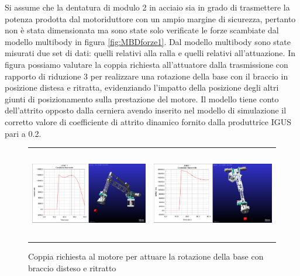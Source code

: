 \documentclass[%
corpo=11pt,
twoside,
 stile=classica,
oldstyle,
greek,%
]{toptesi}
\begin{document}
		Si assume che la dentatura di modulo 2 in acciaio sia in grado di trasmettere la potenza prodotta dal motoriduttore con un ampio margine di sicurezza, pertanto non è stata dimensionata ma sono state solo verificate le forze scambiate dal modello multibody in figura \ref{fig:MBDforze1}. 
		Dal modello multibody sono state misurati due set di dati: quelli relativi alla ralla e quelli relativi all'attuazione. 
		In figura possiamo valutare la coppia richiesta all'attuatore dalla trasmissione con rapporto di riduzione 3 per realizzare una rotazione della base con il braccio in posizione distesa e ritratta, evidenziando l'impatto della posizione degli altri giunti di posizionamento sulla prestazione del motore. 
		Il modello tiene conto dell'attrito opposto dalla cerniera avendo inserito nel modello di simulazione il corretto valore di coefficiente di attrito dinamico fornito dalla produttrice IGUS pari a 0.2. 

		\begin{figure} [!ht]
			\centering
			\begin{tabular}{ll}
				\includegraphics[height=4cm,keepaspectratio]{Plots/BASE/joint1_FAVOREVOLE.png}
				&
				\includegraphics[height=4cm,keepaspectratio]{Plots/BASE/joint1_sfavorevole.png}
			\end{tabular}
			\caption{Coppia richiesta al motore per attuare la rotazione della base con braccio disteso e ritratto}
			\label{fig:MBDcoppia1}
		\end{figure}
	
\end{document}
